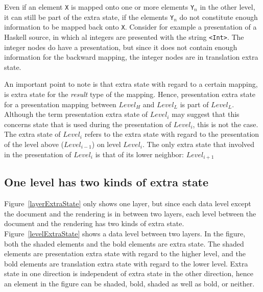 
Even if an element \verb|X| is mapped onto one or more elements \verb|Y|$_n$  in the other level, it can still be part of the extra state, if the elements \verb|Y|$_n$ do not constitute enough information to be mapped back onto \verb|X|. Consider for example a presentation of a Haskell source, in which al integers are presented with the string \verb|<Int>|. The integer nodes do have a presentation, but since it does not contain enough information for the backward mapping, the integer nodes are in translation extra state.  

An important point to note is that extra state with regard to a certain mapping, is extra state for the {\em result} type of the mapping. Hence, presentation extra state for a presentation mapping between $Level_{H}$ and $Level_{L}$ is part of $Level_{L}$. Although the term presentation extra state of $Level_i$ may suggest that this concerns state that is used during the presentation of $Level_i$, this is not the case. The extra state of $Level_i$ refers to the extra state with regard to the presentation of the level above ($Level_{i-1}$) on level $Level_i$. The only extra state that involved in the presentation of $Level_i$ is that of its lower neighbor: $Level_{i+1}$



%																
\subsection{One level has two kinds of extra state} \label{sect:oneLevelDoubleES}

Figure~\ref{layerExtraState} only shows one layer, but since each data level except the document and the rendering is in between two layers, each level between the document and the rendering has two kinds of extra state. Figure~\ref{levelExtraState} shows a data level between two layers. In the figure, both the shaded elements and the bold elements are extra state. The shaded elements are presentation extra state with regard to the higher level, and the bold elements are translation extra state with regard to the lower level. Extra state in one direction is independent of extra state in the other direction, hence an element in the figure can be shaded, bold, shaded as well as bold, or neither. 

